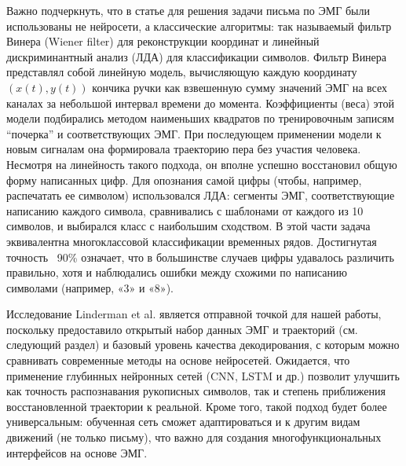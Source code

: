 \documentclass[12pt,a4paper]{article}
\begin{document}
Важно подчеркнуть, что в статье для решения задачи письма по ЭМГ были использованы не нейросети, а классические алгоритмы: так называемый фильтр Винера (Wiener filter) для реконструкции координат и линейный дискриминантный анализ (ЛДА) для классификации символов. Фильтр Винера представлял собой линейную модель, вычисляющую каждую координату $(x(t), y(t))$ кончика ручки как взвешенную сумму значений ЭМГ на всех каналах за небольшой интервал времени до момента\cite{36, 37}. Коэффициенты (веса) этой модели подбирались методом наименьших квадратов по тренировочным записям “почерка” и соответствующих ЭМГ. При последующем применении модели к новым сигналам она формировала траекторию пера без участия человека. Несмотря на линейность такого подхода, он вполне успешно восстановил общую форму написанных цифр. Для опознания самой цифры (чтобы, например, распечатать ее символом) использовался ЛДА: сегменты ЭМГ, соответствующие написанию каждого символа, сравнивались с шаблонами от каждого из 10 символов, и выбирался класс с наибольшим сходством. В этой части задача эквивалентна многоклассовой классификации временных рядов. Достигнутая точность ~90\% означает, что в большинстве случаев цифры удавалось различить правильно, хотя и наблюдались ошибки между схожими по написанию символами (например, «3» и «8»).


Исследование Linderman et al. является отправной точкой для нашей работы, поскольку предоставило открытый набор данных ЭМГ и траекторий (см. следующий раздел) и базовый уровень качества декодирования, с которым можно сравнивать современные методы на основе нейросетей. Ожидается, что применение глубинных нейронных сетей (CNN, LSTM и др.) позволит улучшить как точность распознавания рукописных символов, так и степень приближения восстановленной траектории к реальной. Кроме того, такой подход будет более универсальным: обученная сеть сможет адаптироваться и к другим видам движений (не только письму), что важно для создания многофункциональных интерфейсов на основе ЭМГ.
\end{document}
